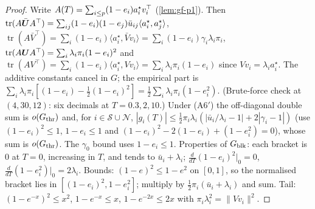 \begin{proof}
Write $A(T)=\sum_{i\le p}(1-e_i)a_i^\star v_i^{\top}$ (\cref{lem:gf-p1}). Then $\operatorname{tr}(A\bar{\bm{U}} A^{\top})=\sum_{ij}(1-e_i)(1-e_j)\bar u_{ij}\langle a_i^\star,a_j^\star\rangle$, $\operatorname{tr}(A\bar V^{\top})=\sum_i(1-e_i)\langle a_i^\star,\bar Vv_i\rangle=\sum_i(1-e_i)\gamma_i\lambda_i\pi_i$, $\operatorname{tr}(A\bm{U} A^{\top})=\sum_i\lambda_i\pi_i(1-e_i)^2$ and $\operatorname{tr}(AV^{\top})=\sum_i(1-e_i)\langle a_i^\star,Vv_i\rangle=\sum_i\lambda_i\pi_i(1-e_i)$ since $Vv_i=\lambda_ia_i^\star$. The additive constants cancel in $G$; the empirical part is $\sum_i\lambda_i\pi_i[(1-e_i)-\tfrac12(1-e_i)^2]=\tfrac12\sum_i\lambda_i\pi_i(1-e_i^2)$. (Brute-force check at $(4,30,12)$: six decimals at $T=0.3,2,10$.) Under (A6$'$) the off-diagonal double sum is $o(G_{\rm thr})$ and, for $i\in\mathcal S\cup\mathcal N$, $|g_i(T)|\le\tfrac12\pi_i\lambda_i(|\bar u_i/\lambda_i-1|+2|\gamma_i-1|)$ (use $(1-e_i)^2\le1$, $1-e_i\le1$ and $(1-e_i)^2-2(1-e_i)+(1-e_i^2)=0$), whose sum is $o(G_{\rm thr})$. The $\gamma_0$ bound uses $1-e_i\le1$. Properties of $G_{\rm blk}$: each bracket is $0$ at $T=0$, increasing in $T$, and tends to $\bar u_i+\lambda_i$; $\tfrac{d}{dT}(1-e_i)^2|_0=0$, $\tfrac{d}{dT}(1-e_i^2)|_0=2\lambda_i$. Bounds: $(1-e)^2\le1-e^2$ on $[0,1]$, so the normalised bracket lies in $[(1-e_i)^2,1-e_i^2]$; multiply by $\tfrac12\pi_i(\bar u_i+\lambda_i)$ and sum. Tail: $(1-e^{-x})^2\le x^2$, $1-e^{-x}\le x$, $1-e^{-2x}\le2x$ with $\pi_i\lambda_i^2=\|Vv_i\|^2$.
\end{proof}

